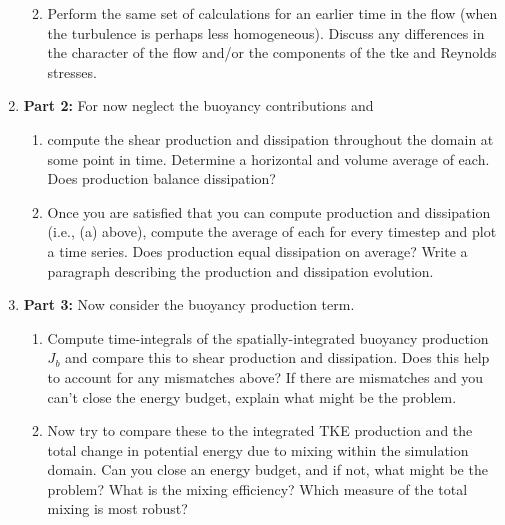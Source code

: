 \documentclass[12pt]{article}
\begin{document}
\begin{enumerate}
\begin{enumerate}
			\clearpage
			\item Perform the same set of calculations for an earlier time in the flow (when the turbulence is perhaps less homogeneous). Discuss any differences in the character of the flow and/or the components of the tke and Reynolds stresses.\par
			
			
			
		\end{enumerate}
	
		\clearpage
		\item \textbf{Part 2:} For now neglect the buoyancy contributions and
		\begin{enumerate}
			\item compute the shear production and dissipation throughout the domain at some point in time. Determine a horizontal and volume average of each. Does production balance dissipation?\par
			
			
			\item Once you are satisfied that you can compute production and dissipation (i.e., (a) above), compute the average of each for every timestep and plot a time series. Does production equal dissipation on average? Write a paragraph describing the production and dissipation evolution.
		\end{enumerate}
	
	
		\clearpage
		\item \textbf{Part 3:} Now consider the buoyancy production term.
		\begin{enumerate}
			\item Compute time-integrals of the spatially-integrated buoyancy production $J_b$ and compare this to shear production and dissipation. Does this help to account for any mismatches above? If there are mismatches and you can't close the energy budget, explain what might be the problem.
			
			
			\item  Now try to compare these to the integrated TKE production and the total change in potential energy due to mixing within the simulation domain. Can you close an energy budget, and if not, what might be the problem? What is the mixing efficiency? Which measure of the total mixing is most robust?
		
		\end{enumerate}
		
	\end{enumerate}
		
	
	
	
	
	
	
	
	
	
\end{document}
